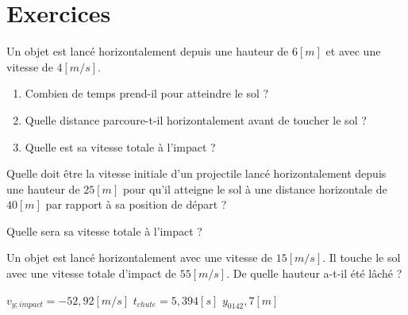 
\section{Exercices}
\begin{exercise}
    Un objet est lancé horizontalement depuis une hauteur de \(6\unit{[m]}\) et avec une vitesse de \(4\unit{[m/s]}\).
    \begin{enumerate}[label=\alph*)]
        \item Combien de temps prend-il pour atteindre le sol ?
        \item Quelle distance parcoure-t-il horizontalement avant de toucher le sol ?
        \item Quelle est sa vitesse totale à l'impact ?
    \end{enumerate}
\end{exercise}

\begin{exercise}
    Quelle doit être la vitesse initiale d'un projectile lancé horizontalement depuis une hauteur de \(25[m]\) pour qu'il atteigne le sol à une distance horizontale de \(40[m]\) par rapport à sa position de départ ?

    Quelle sera sa vitesse totale à l'impact ?
\end{exercise}

\begin{exercise}
    Un objet est lancé horizontalement avec une vitesse de \(15\unit{[m/s]}\). Il touche le sol avec une vitesse totale d'impact de \(55\unit{[m/s]}\). De quelle hauteur a-t-il été lâché ?
\end{exercise}
\begin{solution}
    \(v_{y ; impact}=-52,92\unit{[m/s]}\)
    \(t_{chute}=5,394\unit{[s]}\)
    \(y_0142,7[m]\)
\end{solution}

